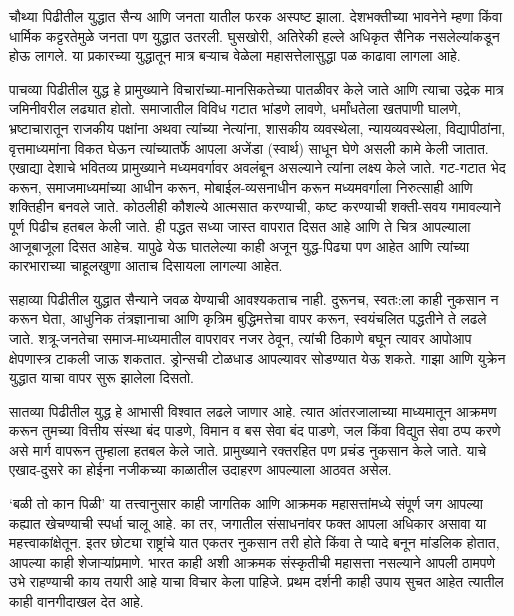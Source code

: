 चौथ्या पिढीतील युद्धात सैन्य आणि जनता यातील फरक अस्पष्ट झाला. देशभक्तीच्या भावनेने म्हणा किंवा धार्मिक कट्टरतेमुळे जनता पण युद्धात उतरली. घुसखोरी, अतिरेकी हल्ले अधिकृत सैनिक नसलेल्यांकडून होऊ लागले. या प्रकारच्या युद्धातून मात्र बऱ्याच वेळेला महासत्तेलासुद्धा पळ काढावा लागला आहे.

पाचव्या पिढीतील युद्ध हे प्रामुख्याने विचारांच्या-मानसिकतेच्या पातळीवर केले जाते आणि त्याचा उद्रेक मात्र जमिनीवरील लढ्यात होतो. समाजातील विविध गटात भांडणे लावणे, धर्मांधतेला खतपाणी घालणे, भ्रष्टाचारातून राजकीय पक्षांना अथवा त्यांच्या नेत्यांना, शासकीय व्यवस्थेला, न्यायव्यवस्थेला, विद्यापीठांना, वृत्तमाध्यमांना विकत घेऊन त्यांच्यातर्फे आपला अजेंडा (स्वार्थ) साधून घेणे असली कामे केली जातात. एखाद्या देशाचे भवितव्य प्रामुख्याने मध्यमवर्गावर अवलंबून असल्याने त्यांना लक्ष्य केले जाते. गट-गटात भेद करून, समाजमाध्यमांच्या आधीन करून, मोबाईल-व्यसनाधीन करून मध्यमवर्गाला निरुत्साही आणि शक्तिहीन बनवले जाते. कोठलीही कौशल्ये आत्मसात करण्याची, कष्ट करण्याची शक्ती-सवय गमावल्याने पूर्ण पिढीच हतबल केली जाते. ही पद्धत सध्या जास्त वापरात दिसत आहे आणि ते चित्र आपल्याला आजूबाजूला दिसत आहेच. यापुढे येऊ घातलेल्या काही अजून युद्ध-पिढ्या पण आहेत आणि त्यांच्या कारभाराच्या चाहूलखुणा आताच दिसायला लागल्या आहेत.

सहाव्या पिढीतील युद्धात सैन्याने जवळ येण्याची आवश्यकताच नाही. दुरूनच, स्वतः:ला काही नुकसान न करून घेता, आधुनिक तंत्रज्ञानाचा आणि कृत्रिम बुद्धिमत्तेचा वापर करून, स्वयंचलित पद्धतीने ते लढले जाते. शत्रू-जनतेचा समाज-माध्यमातील वापरावर नजर ठेवून, त्यांची ठिकाणे बघून त्यावर आपोआप क्षेपणास्त्र टाकली जाऊ शकतात. ड्रोन्सची टोळधाड आपल्यावर सोडण्यात येऊ शकते. गाझा आणि युक्रेन युद्धात याचा वापर सुरू झालेला दिसतो.

सातव्या पिढीतील युद्ध हे आभासी विश्वात लढले जाणार आहे. त्यात आंतरजालाच्या माध्यमातून आक्रमण करून तुमच्या वित्तीय संस्था बंद पाडणे, विमान व बस सेवा बंद पाडणे, जल किंवा विद्युत सेवा ठप्प करणे असे मार्ग वापरून तुम्हाला हतबल केले जाते. प्रामुख्याने रक्तरहित पण प्रचंड नुकसान केले जाते. याचे एखाद-दुसरे का होईना नजीकच्या काळातील उदाहरण आपल्याला आठवत असेल.

`बळी तो कान पिळी' या तत्त्वानुसार काही जागतिक आणि आक्रमक महासत्तांमध्ये संपूर्ण जग आपल्या कह्यात खेचण्याची स्पर्धा चालू आहे. का तर, जगातील संसाधनांवर फक्त आपला अधिकार असावा या महत्त्वाकांक्षेतून. इतर छोट्या राष्ट्रांचे यात एकतर नुकसान तरी होते किंवा ते प्यादे बनून मांडलिक होतात, आपल्या काही शेजाऱ्यांप्रमाणे. भारत काही अशी आक्रमक संस्कृतीची महासत्ता नसल्याने आपली ठामपणे उभे राहण्याची काय तयारी आहे याचा विचार केला पाहिजे. प्रथम दर्शनी काही उपाय सुचत आहेत त्यातील काही वानगीदाखल देत आहे.

